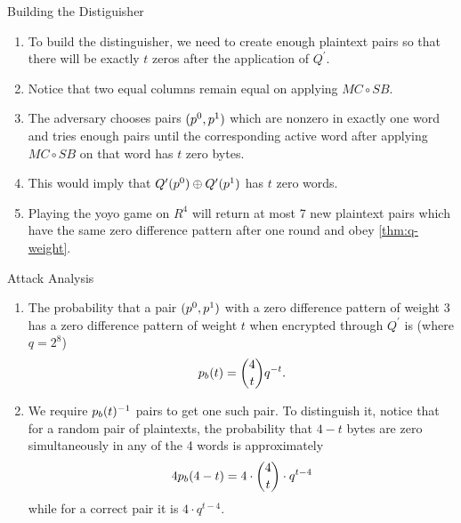 \documentclass[notheorems]{beamer}
\theoremstyle{definition}
\theoremstyle{example}
\begin{document}
    \begin{frame}[<+->]{Building the Distiguisher}
        \begin{enumerate}
            \item To build the distinguisher, we need to create enough plaintext
            pairs so that there will be exactly \(t\) zeros after the
            application of \(Q^\prime\). 
            \item Notice that two equal columns remain equal on applying \(MC
            \circ SB\). 
            \item The adversary chooses pairs \((p^0, p^1)\) which are
            nonzero in exactly one word and tries enough pairs until the
            corresponding active word after applying \(MC \circ SB\) on that
            word has \(t\) zero bytes. 
            \item This would imply that \(Q^\prime(p^0) \oplus
            Q^\prime(p^1)\) has \(t\) zero words. 
            \item Playing the yoyo game on \(R^4\) will return at most 7 new
            plaintext pairs which have the same zero difference pattern after
            one round and obey \cref{thm:q-weight}.
        \end{enumerate}
    \end{frame}

    \begin{frame}[<+->]{Attack Analysis}
        \begin{enumerate}
            \item The probability that a pair \((p^0, p^1)\) with a zero
            difference pattern of weight 3 has a zero difference pattern of
            weight \(t\) when encrypted through \(Q^\prime\) is (where \(q =
            2^8\))
            \begin{equation}
                p_b(t) = \binom{4}{t}q^{-t}.
            \end{equation}
            \item We require \(p_b(t)^{-1}\) pairs to get one such pair. To
            distinguish it, notice that for a random pair of plaintexts, the
            probability that \(4 - t\) bytes are zero simultaneously in any of
            the 4 words is approximately
            \begin{equation}
                4p_b(4 - t) = 4 \cdot \binom{4}{t} \cdot q^{t - 4}
            \end{equation}
            while for a correct pair it is \(4 \cdot q^{t - 4}\). 
        \end{enumerate}
    \end{frame}
\end{document}
